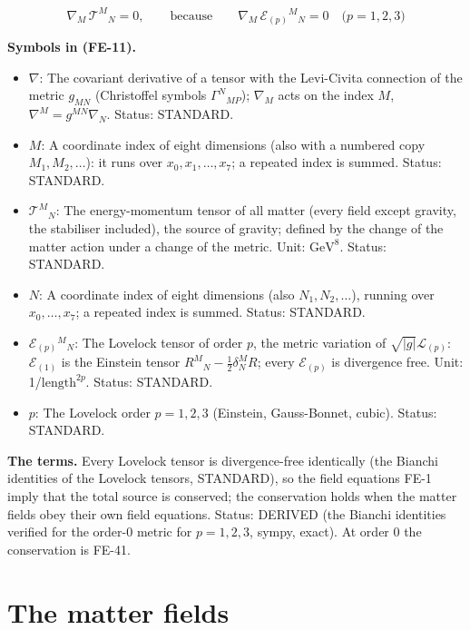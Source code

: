 \documentclass[
  10pt,
]{article}
\providecommand{\tightlist}{%
  \setlength{\itemsep}{0pt}\setlength{\parskip}{0pt}}
\begin{document}
\[
\nabla_M\,\mathcal{T}^M{}_N = 0,\qquad \text{because}\qquad \nabla_M\,\mathcal{E}_{(p)}{}^M{}_N = 0\quad
 \text{($p = 1, 2, 3$)} \tag{FE-11}
\]

\textbf{Symbols in (FE-11).}

\begin{itemize}
\tightlist
\item
  \(\nabla\): The covariant derivative of a tensor with the Levi-Civita
  connection of the metric \(g_{MN}\) (Christoffel symbols
  \(\Gamma^N{}_{MP}\)); \(\nabla_M\) acts on the index \(M\),
  \(\nabla^M = g^{MN}\nabla_N\). Status: STANDARD.
\item
  \(M\): A coordinate index of eight dimensions (also with a numbered
  copy \(M_1, M_2, \dots\)): it runs over \(x_0, x_1, \dots, x_7\); a
  repeated index is summed. Status: STANDARD.
\item
  \(\mathcal{T}^M{}_N\): The energy-momentum tensor of all matter (every
  field except gravity, the stabiliser included), the source of gravity;
  defined by the change of the matter action under a change of the
  metric. Unit: \(\mathrm{GeV}^{8}\). Status: STANDARD.
\item
  \(N\): A coordinate index of eight dimensions (also
  \(N_1, N_2, \dots\)), running over \(x_0, \dots, x_7\); a repeated
  index is summed. Status: STANDARD.
\item
  \(\mathcal{E}_{(p)}{}^M{}_N\): The Lovelock tensor of order \(p\), the
  metric variation of \(\sqrt{\lvert g\rvert}\mathcal{L}_{(p)}\):
  \(\mathcal{E}_{(1)}\) is the Einstein tensor
  \(R^M{}_N - \frac12\delta^M_NR\); every \(\mathcal{E}_{(p)}\) is
  divergence free. Unit: 1/\(\mathrm{length}^{2p}\). Status: STANDARD.
\item
  \(p\): The Lovelock order \(p = 1, 2, 3\) (Einstein, Gauss-Bonnet,
  cubic). Status: STANDARD.
\end{itemize}

\textbf{The terms.} Every Lovelock tensor is divergence-free identically
(the Bianchi identities of the Lovelock tensors, STANDARD), so the field
equations FE-1 imply that the total source is conserved; the
conservation holds when the matter fields obey their own field
equations. Status: DERIVED (the Bianchi identities verified for the
order-0 metric for \(p = 1, 2, 3\), sympy, exact). At order 0 the
conservation is FE-41.

\hypertarget{the-matter-fields}{%
\section{The matter fields}\label{the-matter-fields}}
\end{document}
